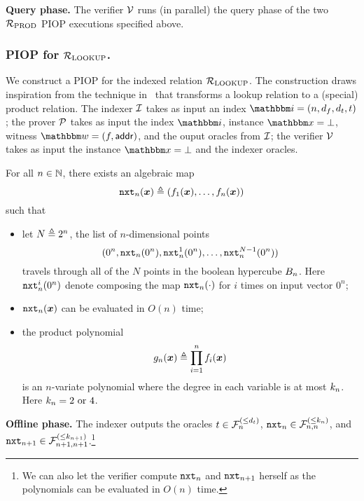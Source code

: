 \textbf{Query phase.}
The verifier $\mathcal{V}$ runs (in parallel) the query phase of the two ${\mathcal{R}}_{\text{PROD}}$ PIOP 
executions specified above.

\subsubsection*{PIOP for ${\mathcal{R}}_{\text{LOOKUP}}$.} 
We construct a PIOP for the indexed relation ${\mathcal{R}}_{\text{LOOKUP}}$.
The construction draws inspiration from the technique in~\cite{GW20} that 
transforms a lookup relation to a (special) product relation.
The indexer $\mathcal{I}$ takes as input an index $\idxR = (n, d_f, d_t, t)$;
the prover $\mathcal{P}$ takes as input the index $\idxR$, instance $\instR = \bot$,
witness $\witR = (f, \addr)$, and the ouput oracles from $\mathcal{I}$;
the verifier $\mathcal{V}$ takes as input the instance $\instR = \bot$ and 
the indexer oracles.

\begin{lemma}
    For all $n \in \mathbb{N}$, there exists an algebraic map
    \[
      \mathtt{nxt}_{n}(\boldsymbol{x}) \mathrel{\triangleq} (f_{1}(\boldsymbol{x}), \dots, f_{n}(\boldsymbol{x}))  
    \] such that 
    \begin{itemize}
        \item let $N \mathrel{\triangleq} 2^n$, the list of $n$-dimensional points
            \[
              (0^n, \mathtt{nxt}_{n}(0^n), \mathtt{nxt}_{n}^{1}(0^n), \dots, \mathtt{nxt}_{n}^{N-1}(0^n))
            \]
            travels through all of the $N$ points in the boolean hypercube $B_{n}$.
            Here $\mathtt{nxt}_{n}^{i}(0^n)$ denote composing the map $\mathtt{nxt}_{n}(\cdot)$ for $i$ times
            on input vector $0^n$;
        \item $\mathtt{nxt}_{n}(\boldsymbol{x})$ can be evaluated in $O(n)$ time;
        \item the product polynomial
            \[
                g_n(\boldsymbol{x}) \mathrel{\triangleq} \prod_{i=1}^{n} f_{i}(\boldsymbol{x})
            \] is an $n$-variate polynomial where the degree in each variable is at most $k_{n}$.
            Here $k_{n} = 2 \text{ or } 4$.
    \end{itemize}
\end{lemma}

\textbf{Offline phase.}
The indexer outputs the oracles $t \in {\mathcal{F}}_{n}^{(\le{d_t})}$, $\mathtt{nxt}_{n} \in {\mathcal{F}}_{n,n}^{(\le{k_{n}})}$,
and $\mathtt{nxt}_{n+1} \in {\mathcal{F}}_{n+1,n+1}^{(\le{k_{n+1}})}$.\footnote{We can also let the verifier 
compute $\mathtt{nxt}_{n}$ and $\mathtt{nxt}_{n+1}$ herself as the polynomials can be evaluated in $O(n)$ time.}

